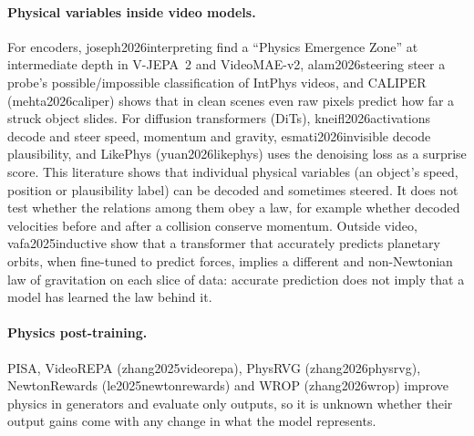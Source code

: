 \documentclass[10pt]{article}
\providecommand{\citet}[1]{\textsf{#1}}
\providecommand{\citep}[1]{(\textsf{#1})}
\begin{document}
\paragraph{Physical variables inside video models.}
For encoders, \citet{joseph2026interpreting} find a ``Physics Emergence Zone'' at intermediate depth in V-JEPA~2 and
VideoMAE-v2, \citet{alam2026steering} steer a probe's possible/impossible classification of IntPhys videos, and
CALIPER \citep{mehta2026caliper} shows that in clean scenes even raw pixels predict how far a struck object slides. For diffusion transformers (DiTs), \citet{kneifl2026activations} decode
and steer speed, momentum and gravity, \citet{esmati2026invisible} decode plausibility, and LikePhys
\citep{yuan2026likephys} uses the denoising loss as a surprise score. This literature shows that individual physical variables (an object's speed, position or
plausibility label) can be decoded and sometimes steered. It does not test whether the relations among them obey a
law, for example whether decoded velocities before and after a collision conserve momentum. Outside video,
\citet{vafa2025inductive} show that a transformer that accurately predicts planetary orbits, when fine-tuned to predict
forces, implies a different and non-Newtonian law of gravitation on each slice of data: accurate prediction does not
imply that a model has learned the law behind it.

\paragraph{Physics post-training.}
PISA, VideoREPA \citep{zhang2025videorepa}, PhysRVG \citep{zhang2026physrvg}, NewtonRewards \citep{le2025newtonrewards}
and WROP \citep{zhang2026wrop} improve physics in generators and evaluate only outputs, so it is unknown whether
their output gains come with any change in what the model represents.
\end{document}
